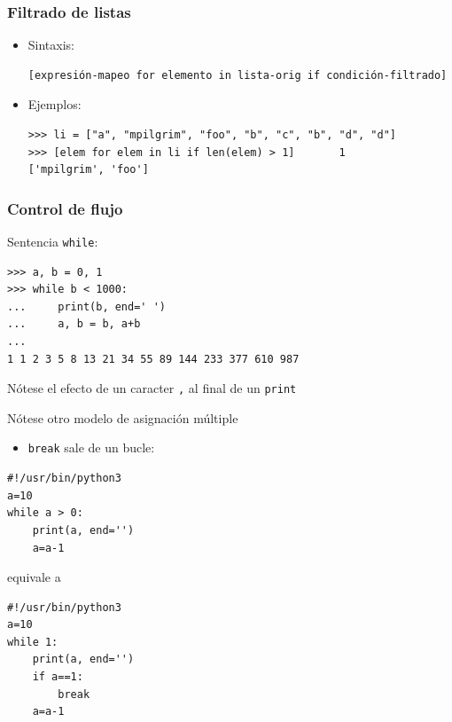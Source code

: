 \begin{frame}[fragile]
\frametitle{Filtrado de listas}
\begin{itemize}
\item Sintaxis:
\begin{footnotesize}
\begin{verbatim}
[expresión-mapeo for elemento in lista-orig if condición-filtrado]
\end{verbatim}
\end{footnotesize}
\item Ejemplos:
\begin{footnotesize}
\begin{verbatim}
>>> li = ["a", "mpilgrim", "foo", "b", "c", "b", "d", "d"]
>>> [elem for elem in li if len(elem) > 1]       1
['mpilgrim', 'foo']
\end{verbatim}
\end{footnotesize}

\end{itemize}
 
\end{frame}








\begin{frame}[fragile]
 
\frametitle{Control de flujo}
Sentencia \verb|while|:
\begin{footnotesize}
\begin{verbatim}
>>> a, b = 0, 1
>>> while b < 1000:
...     print(b, end=' ')
...     a, b = b, a+b
... 
1 1 2 3 5 8 13 21 34 55 89 144 233 377 610 987
\end{verbatim}
\end{footnotesize}
Nótese el efecto de un caracter \verb|,| al final de un \verb|print|

Nótese otro modelo de asignación múltiple 

\end{frame}


\begin{frame}[fragile]

\begin{itemize}
  
\item 
\verb|break| sale de un bucle:
\end{itemize}

\begin{footnotesize}
\begin{verbatim}
#!/usr/bin/python3
a=10
while a > 0:
    print(a, end='')
    a=a-1

\end{verbatim}
\end{footnotesize}

equivale a 

\begin{footnotesize}
\begin{verbatim}
#!/usr/bin/python3
a=10
while 1:
    print(a, end='')
    if a==1:
        break
    a=a-1
\end{verbatim}
\end{footnotesize}
\end{frame}





